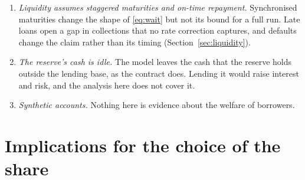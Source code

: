 \documentclass[preprint,11pt,authoryear]{elsarticle}
\theoremstyle{definition}
\begin{document}
\begin{enumerate}
  the whole deposit. The two rules of Section~\ref{sec:model} bracket the horizon question but do not settle it: a discounted
  utility over an uncertain holding period, with entry cohorts that find the reserve at different levels, would be a third.
\item \emph{Liquidity assumes staggered maturities and on-time repayment.} Synchronised maturities change the shape of \eqref{eq:wait}
  but not its bound for a full run. Late loans open a gap in collections that no rate correction captures, and defaults change
  the claim rather than its timing (Section~\ref{sec:liquidity}).
\item \emph{The reserve's cash is idle.} The model leaves the cash that the reserve holds outside the lending base, as the contract does. Lending
  it would raise interest and risk, and the analysis here does not cover it.
\item \emph{Synthetic accounts.} Nothing here is evidence about the welfare of borrowers.
\end{enumerate}

\section{Implications for the choice of the share}\label{sec:implications}
\end{document}
